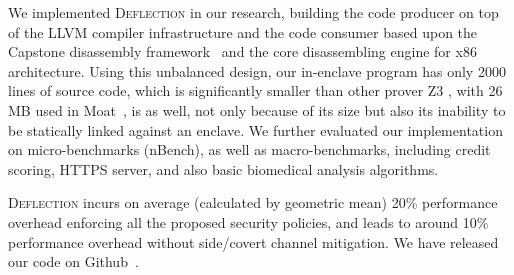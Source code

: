 We implemented \textsc{Deflection} in our research, building the code producer on top of the LLVM compiler infrastructure and the code consumer based upon the Capstone disassembly framework~\cite{capstone} and the core disassembling engine for x86 architecture. 
Using this unbalanced design, our in-enclave program has only 2000 lines of source code, which is significantly smaller than other \DIFdelbegin {}\DIFdelend \DIFaddbegin {}\DIFaddend prover Z3 \DIFaddbegin {}\DIFaddend , with 26 MB used in Moat~\cite{sinha2015moat}, is \DIFdelbegin {}\DIFdelend \DIFaddbegin {}\DIFaddend as well, not only because of its size but also its inability to be statically linked against an enclave.
We further evaluated our implementation on micro-benchmarks (nBench), as well as macro-benchmarks, including credit scoring, HTTPS server, and also basic biomedical analysis algorithms.


\textsc{Deflection} incurs on average (calculated by geometric mean) 20\% performance overhead
enforcing all the proposed security policies, and leads to around 10\% performance overhead
without side/covert channel mitigation.
We have released our code on Github~\cite{our-prototype}.





